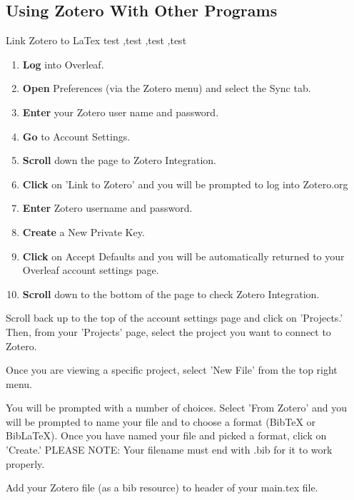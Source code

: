 \documentclass[10pt,a4paper]{article}
\begin{document}
\subsection{Using Zotero With Other Programs}

\begin{textbox}{Link Zotero to LaTex}
test  \sep test \sep test \sep test

\bigskip

\begin{enumerate}
\item \textbf{Log} into Overleaf.
\item \textbf{Open} Preferences (via the Zotero menu) and select the Sync tab.
\item \textbf {Enter} your Zotero user name and password.
\item \textbf {Go} to Account Settings.
\item \textbf {Scroll} down the page to Zotero Integration.
\item \textbf {Click} on 'Link to Zotero' and you will be prompted to log into Zotero.org
\item \textbf {Enter} Zotero username and password.
\item \textbf {Create} a New Private Key.
\item \textbf {Click} on Accept Defaults and you will be automatically returned to your Overleaf account settings page.
\item \textbf {Scroll} down to the bottom of the page to check Zotero Integration.
\end{enumerate}

\end{textbox}

 
Scroll back up to the top of the account settings page and click on 'Projects.' Then, from your 'Projects' page, select the project you want to connect to Zotero.
 
Once you are viewing a specific project, select 'New File' from the top right menu.


 
You will be prompted with a number of choices. Select 'From Zotero' and you will be prompted to name your file and to choose a format (BibTeX or BibLaTeX). Once you have named your file and picked a format, click on 'Create.' PLEASE NOTE: Your filename must end with .bib for it to work properly.


 
Add your Zotero file (as a bib resource) to header of your main.tex file.
\end{document}
